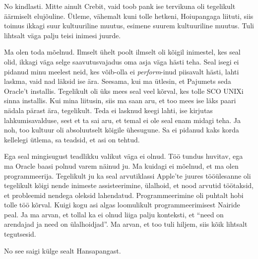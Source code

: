 
No kindlasti. Mitte ainult Crebit, vaid toob pank ise tervikuna oli tegelikult äärmiselt elujõuline. Ütleme, vähemalt kuni tolle hetkeni, Hoiupangaga liituti, siis toimus ikkagi suur kultuuriline muutus, esimene suurem kultuuriline muutus. Tuli lihtsalt väga palju teisi inimesi juurde.


Ma olen toda mõelnud. Ilmselt ühelt poolt ilmselt oli kõigil inimestel, kes seal olid, ikkagi väga selge saavutusvajadus oma asja väga hästi teha. Seal isegi ei pidanud minu meelest neid, kes võib-olla ei \emph{perform}-inud piisavalt hästi, lahti laskma, vaid nad läksid ise ära. Seesama, kui ma ütlesin, et Pajumets seda Oracle't installis. Tegelikult oli üks mees seal veel kõrval, kes tolle SCO UNIXi sinna installis. Kui mina liitusin, siis ma saan aru, et too mees ise läks paari nädala pärast ära, tegelikult. Teda ei lasknud keegi lahti, ise kirjutas lahkumisavalduse, sest et ta sai aru, et temal ei ole seal enam midagi teha. Ja noh, too kultuur oli absoluutselt kõigile ühesugune. Sa ei pidanud kaks korda kellelegi ütlema, sa teadsid, et asi on tehtud.


Ega seal mingisugust  teadlikku valikut väga ei olnud. Töö tundus huvitav, ega ma Oracle baasi polnud varem näinud ju. Ma kuidagi ei mõelnud, et ma olen programmeerija. Tegelikult ju ka seal arvutiklassi Apple'te juures  tööülesanne oli tegelikult kõigi nende inimeste assisteerimine, ülalhoid, et nood arvutid töötaksid, et probleemid nendega oleksid lahendatud. Programmeerimine oli puhtalt hobi tolle töö kõrval. Kuigi kogu asi algas loomulikult programmeerimisest Nairide peal. Ja ma arvan, et tollal ka ei olnud liiga palju konteksti, et \enquote{need on arendajad ja need on ülalhoidjad}. Ma arvan, et too tuli hiljem, siis kõik lihtsalt tegutsesid.


No see saigi külge sealt Hansapangast. 

